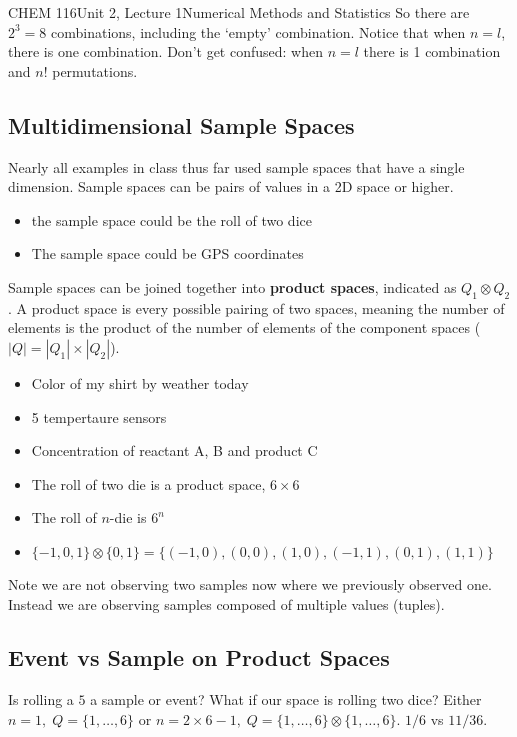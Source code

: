 \documentclass{article}
\begin{document}
\begin{tdoc}{CHEM 116}{Unit 2, Lecture 1}{Numerical Methods and Statistics}
So there are $2^3 = 8$ combinations, including the `empty' combination. Notice that when $n = l$, there is one combination. Don't get confused: when $n = l$ there is 1 combination and $n!$ permutations.

\subsection{Multidimensional Sample Spaces}

Nearly all examples in class thus far used sample spaces that have a single
dimension. Sample spaces can be pairs of values in a 2D space or
higher.

\begin{itemize}
\item the sample space could be the roll of two dice
\item The sample space could be GPS coordinates
\end{itemize}

Sample spaces can be joined together into {\bf product spaces},
indicated as $Q_1 \otimes Q_2$. A product space is every possible
pairing of two spaces, meaning the number of elements is the product
of the number of elements of the component spaces ($|Q| = |Q_1| \times
|Q_2|$).

\begin{itemize}

\item Color of my shirt by weather today
\item 5 tempertaure sensors
\item Concentration of reactant A, B and product C
\item The roll of two die is a product space, $6\times 6$
\item The roll of $n$-die is $6^n$
\item $\{-1,0,1\} \otimes \{0,1\} = \{(-1,0), (0,0), (1,0), (-1,1), (0,1), (1,1)\}$

\end{itemize}

Note we are not observing two samples now where we previously observed
one. Instead we are observing samples composed of multiple values
(tuples).

\subsection{Event vs Sample on Product Spaces}
Is rolling a $5$ a sample or event? What if our space is rolling two
dice? Either $n=1,\; Q=\{1,\ldots,6\}$ or $n=2\times 6 - 1,\; Q=\{1,\ldots,6\} \otimes \{1,\ldots,6\}$.
$1/6$ vs $11/36$.


\end{tdoc}
\end{document}
